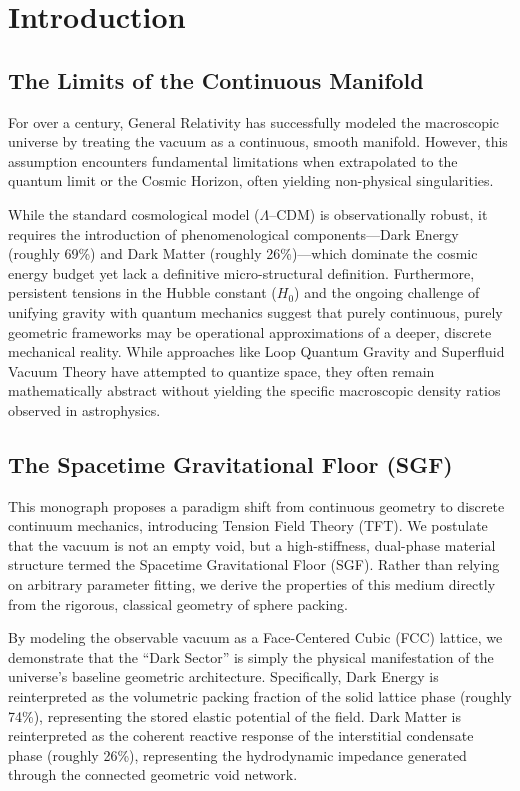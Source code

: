\chapter{Introduction}

\section{The Limits of the Continuous Manifold}
For over a century, General Relativity has successfully modeled the macroscopic universe by treating the vacuum as a continuous, smooth manifold. However, this assumption encounters fundamental limitations when extrapolated to the quantum limit or the Cosmic Horizon, often yielding non-physical singularities.

While the standard cosmological model ($\Lambda$--CDM) is observationally robust, it requires the introduction of phenomenological components---Dark Energy (roughly 69\%) and Dark Matter (roughly 26\%)---which dominate the cosmic energy budget yet lack a definitive micro-structural definition. Furthermore, persistent tensions in the Hubble constant ($H_0$) and the ongoing challenge of unifying gravity with quantum mechanics suggest that purely continuous, purely geometric frameworks may be operational approximations of a deeper, discrete mechanical reality. While approaches like Loop Quantum Gravity and Superfluid Vacuum Theory \cite{Rovelli_1998, Volovik_2003} have attempted to quantize space, they often remain mathematically abstract without yielding the specific macroscopic density ratios observed in astrophysics.

\section{The Spacetime Gravitational Floor (SGF)}
This monograph proposes a paradigm shift from continuous geometry to discrete continuum mechanics, introducing Tension Field Theory (TFT). We postulate that the vacuum is not an empty void, but a high-stiffness, dual-phase material structure termed the Spacetime Gravitational Floor (SGF). Rather than relying on arbitrary parameter fitting, we derive the properties of this medium directly from the rigorous, classical geometry of sphere packing.

By modeling the observable vacuum as a Face-Centered Cubic (FCC) lattice, we demonstrate that the ``Dark Sector'' is simply the physical manifestation of the universe's baseline geometric architecture. Specifically, Dark Energy is reinterpreted as the volumetric packing fraction of the solid lattice phase (roughly 74\%), representing the stored elastic potential of the field. Dark Matter is reinterpreted as the coherent reactive response of the interstitial condensate phase (roughly 26\%), representing the hydrodynamic impedance generated through the connected geometric void network.

